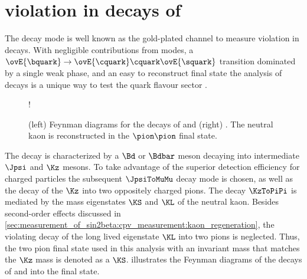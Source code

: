 
\section[
  head={\CP violation in decays of \BdToJpsiKS},
  tocentry={\CPHyperref violation in decays of \BdToJpsiKSHyperref}
]{\CPbfsf violation in decays of \BdToJpsiKSbfsf}
\label{sec:cpv_theory:bd2jpsiks}

The decay mode \BdToJpsiKS is well known as the gold-plated channel to measure
\CP violation in \Bd decays. With negligible contributions from \DCS modes, a
$\ovE{\bquark}\to\ovE{\cquark}\cquark\ovE{\squark}$ transition dominated by a
single weak phase, and an easy to reconstruct final state the analysis of
\BdToJpsiKS decays is a unique way to test the \SM quark flavour sector
\cite{Bevan:2014iga}.

\begin{figure}[ht]
\centering
\resizebox {1\textwidth} {!}{
  
   
}
\caption{(left) Feynman diagrams for the decays of \BdToJpsiKz and (right)
\BdbarToJpsiKzbar. The neutral kaon is reconstructed in the $\pion\pion$ final
state.}
\label{fig:cpv_theory:bd2jpsiks:feynman_bdtojpsiks}
\end{figure}

The decay is characterized by a $\Bd$ or $\Bdbar$ meson decaying into
intermediate $\Jpsi$ and $\Kz$ mesons. To take advantage of the superior
detection efficiency for charged particles the subsequent $\JpsiToMuMu$ decay
mode is chosen, as well as the decay of the $\Kz$ into two oppositely charged
pions. The decay $\KzToPiPi$ is mediated by the mass eigenstates $\KS$ and $\KL$
of the neutral kaon. Besides second-order effects discussed in
\cref{sec:measurement_of_sin2beta:cpv_measurement:kaon_regeneration}, the \CP
violating decay of the long lived eigenstate $\KL$ into two pions is neglected.
Thus, the two pion final state used in this analysis with an invariant mass that
matches the $\Kz$ mass is denoted as a $\KS$.
 illustrates the Feynman
diagrams of the decays of \Bd and \Bdbar into the \Jpsi\KS final state.


